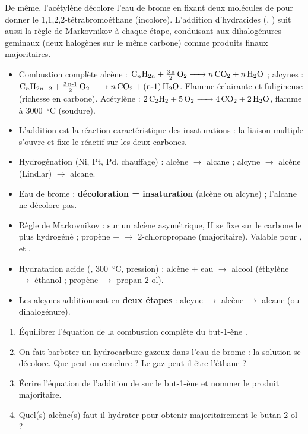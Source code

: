 \documentclass[11pt]{article}
\newcommand{\cle}[1]{{\popxbold\color{popdark}#1}}
\begin{document}
De même, l'acétylène décolore l'eau de brome en fixant deux molécules de  pour donner le 1,1,2,2-tétrabromoéthane  (incolore). L'addition d'hydracides (, ) suit aussi la règle de Markovnikov à chaque étape, conduisant aux dihalogénures geminaux (deux halogènes sur le même carbone) comme produits finaux majoritaires.

\begin{aretenir}
\begin{itemize}
\item Combustion complète alcène : $\ce{C_{n}H_{2n} + \frac{3n}{2} O2 -> n CO2 + n H2O}$ ; alcynes : $\ce{C_{n}H_{2n-2} + \frac{3n-1}{2} O2 -> n CO2 + (n-1) H2O}$. Flamme éclairante et fuligineuse (richesse en carbone). Acétylène : $\ce{2 C2H2 + 5 O2 -> 4 CO2 + 2 H2O}$, flamme à \SI{3000}{\celsius} (soudure).
\item L'\cle{addition} est la réaction caractéristique des insaturations : la liaison multiple s'ouvre et fixe le réactif sur les deux carbones.
\item Hydrogénation (Ni, Pt, Pd, chauffage) : alcène $\rightarrow$ alcane ; alcyne $\rightarrow$ alcène (Lindlar) $\rightarrow$ alcane.
\item Eau de brome : \textbf{décoloration = insaturation} (alcène ou alcyne) ; l'alcane ne décolore pas.
\item Règle de \cle{Markovnikov} : sur un alcène asymétrique, H se fixe sur le carbone le plus hydrogéné ; propène +  $\rightarrow$ 2-chloropropane (majoritaire). Valable pour ,  et .
\item Hydratation acide (, \SI{300}{\celsius}, pression) : alcène + eau $\rightarrow$ alcool (éthylène $\rightarrow$ éthanol ; propène $\rightarrow$ propan-2-ol).
\item Les alcynes additionnent en \textbf{deux étapes} : alcyne $\rightarrow$ alcène $\rightarrow$ alcane (ou dihalogénure).
\end{itemize}
\end{aretenir}

\begin{exercice}
\begin{enumerate}
\item Équilibrer l'équation de la combustion complète du but-1-ène .
\item On fait barboter un hydrocarbure gazeux dans l'eau de brome : la solution se décolore. Que peut-on conclure ? Le gaz peut-il être l'éthane ?
\item Écrire l'équation de l'addition de  sur le but-1-ène  et nommer le produit majoritaire.
\item Quel(s) alcène(s) faut-il hydrater pour obtenir majoritairement le butan-2-ol ?
\end{enumerate}
\end{exercice}
\end{document}
